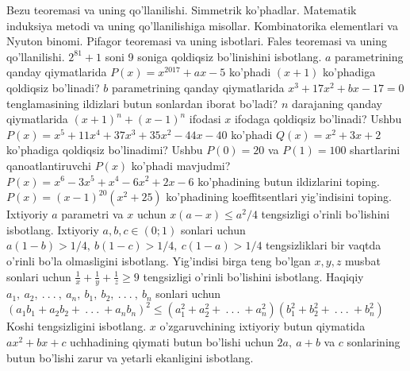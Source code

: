 Bezu teoremasi va uning qo'llanilishi.
Simmetrik ko'phadlar.
Matematik induksiya metodi va uning qo'llanilishiga misollar.
Kombinatorika elementlari va Nyuton binomi.
Pifagor teoremasi va uning isbotlari.
Fales teoremasi va uning qo'llanilishi.
\(2^{81} + 1\) soni 9 soniga qoldiqsiz bo'linishini isbotlang.
\(a\) parametrining qanday qiymatlarida \(P(x) = x^{2017} + ax - 5\) ko'phadi \((x + 1)\) ko'phadiga qoldiqsiz bo'linadi?
\(b\) parametrining qanday qiymatlarida \(x^{3} + 17x^{2} + bx - 17 = 0\) tenglamasining ildizlari butun sonlardan iborat bo'ladi?
\(n\) darajaning qanday qiymatlarida \((x + 1)^{n} + (x - 1)^{n}\) ifodasi \(x\) ifodaga qoldiqsiz bo'linadi?
Ushbu \(P(x) = x^{5} + 11x^{4} + 37x^{3} + 35x^{2} - 44x - 40\) ko'phadi \(Q(x) = x^{2} + 3x + 2\) ko'phadiga qoldiqsiz bo'linadimi?
Ushbu \(P(0) = 20\) va \(P(1) = 100\) shartlarini qanoatlantiruvchi \(P(x)\) ko'phadi mavjudmi?
\(P(x) = x^{6} - 3x^{5} + x^{4} - 6x^{2} + 2x - 6\) ko'phadining butun ildizlarini toping.
\(P(x) = (x - 1)^{20}\left( x^{2} + 25 \right)\) ko'phadining koeffitsentlari yig'indisini toping.
Ixtiyoriy \(a\) parametri va \(x\) uchun \(x(a - x) \leq a^{2}/4\) tengsizligi o'rinli bo'lishini isbotlang.
Ixtiyoriy \(a,b,c \in (0;1)\) sonlari uchun \(a(1 - b) > 1/4,\ b(1 - c) > 1/4,\ c(1 - a) > 1/4\) tengsizliklari bir vaqtda o'rinli bo'la olmasligini isbotlang.
Yig'indisi birga teng bo'lgan \(x,y,z\) musbat sonlari uchun \(\frac{1}{x} + \frac{1}{y} + \frac{1}{z} \geq 9\) tengsizligi o'rinli bo'lishini isbotlang.
Haqiqiy \(a_{1},\ a_{2},\ .\ .\ .\ ,\ a_{n},\ b_{1},\ b_{2},\ .\ .\ .\ ,\ b_{n}\) sonlari uchun \(\left( a_{1}b_{1} + a_{2}b_{2} + \ .\ .\ .\  + a_{n}b_{n} \right)^{2} \leq \left( a_{1}^{2} + a_{2}^{2} + \ .\ .\ .\  + a_{n}^{2} \right)\left( b_{1}^{2} + b_{2}^{2} + \ .\ .\ .\  + b_{n}^{2} \right)\)
Koshi tengsizligini isbotlang.
\(x\) o'zgaruvchining ixtiyoriy butun qiymatida \(ax^{2} + bx + c\) uchhadining qiymati butun bo'lishi uchun \(2a,\ a + b\) va \(c\) sonlarining butun bo'lishi zarur va yetarli ekanligini isbotlang.